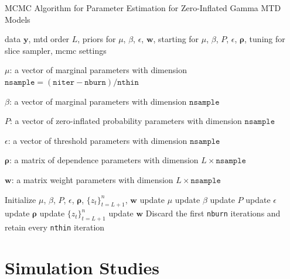 \documentclass[
  letterpaper,
  double,
  12pt,
  1.0in]{beavtex}
\begin{document}
\begin{algorithm}
\caption{MCMC Algorithm for Parameter Estimation for Zero-Inflated Gamma MTD Models}
\label{alg:mcmc-2}
\begin{algorithmic}

\Require data $\boldsymbol{y}$, mtd order $L$, priors for $\mu$, $\beta$, $\epsilon$, $\boldsymbol{w}$, starting for $\mu$, $\beta$, $P$, $\epsilon$, $\boldsymbol{\rho}$, tuning for slice sampler, mcmc settings

\Ensure 
\State $\mu$: a vector of marginal parameters with dimension $\texttt{nsample} =(\texttt{niter} - \texttt{nburn}) / \texttt{nthin}$

\State $\beta$: a vector of marginal parameters with dimension $\texttt{nsample}$

\State $P$: a vector of zero-inflated probability parameters with dimension $\texttt{nsample}$

\State $\epsilon$: a vector of threshold parameters with dimension $\texttt{nsample}$

\State $\boldsymbol{\rho}$: a matrix of dependence parameters with dimension $L \times \texttt{nsample}$

\State $\boldsymbol{w}$: a matrix weight parameters with dimension $L \times \texttt{nsample}$

\State Initialize $\mu$, $\beta$, $P$, $\epsilon$, $\boldsymbol{\rho}$, ${\{z_t\}}_{t=L+1}^n$, $\boldsymbol{w}$
    \State update $\mu$ 
    \State update $\beta$ 
    \State update $P$ 
    \State update $\epsilon$ 
    \State update $\boldsymbol{\rho}$ 
    \State update ${\{z_t\}}_{t=L+1}^n$ 
    \State update $\boldsymbol{w}$ 
\EndFor
\State Discard the first 
\texttt{nburn}
iterations and retain every 
\texttt{nthin} iteration 
\end{algorithmic}
\end{algorithm}

\chapter{Simulation Studies}\label{sec-ch2-simu}
\end{document}
